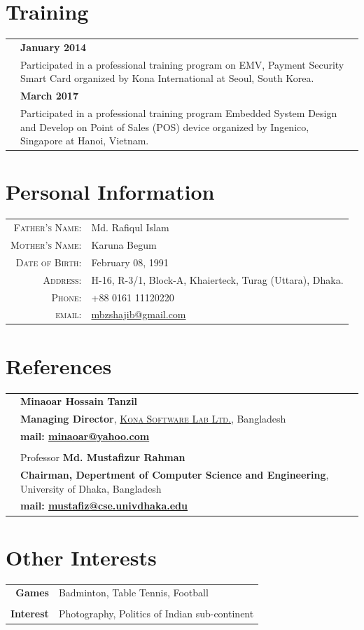 \documentclass[a4paper,10pt]{article}
\newcommand{\du}{University of Dhaka}
\newcommand{\bd}{Bangladesh}
\newcommand{\kslwithlink}{\textsc{\href{www.konai.com}{Kona Software Lab Ltd.}}}
\begin{document}
\section*{Training}

\begin{tabular}{r|p{16cm}}
							&\textbf{January 2014}\\
							&Participated in a professional training program on EMV, Payment Security Smart Card organized by Kona International at Seoul, South Korea.\\
							&\textbf{March 2017}\\
							&Participated in a professional training program Embedded System Design and Develop on Point of Sales (POS) device organized by Ingenico, Singapore at Hanoi, Vietnam.\\
\end{tabular}

\section*{Personal Information}

\begin{tabular}{r|l}
    \textsc{Father's Name:} & Md. Rafiqul Islam \\
    \textsc{Mother's Name:} & Karuna Begum \\    
    \textsc{Date of Birth:} & February 08, 1991 \\
    \textsc{Address:}   & H-16, R-3/1, Block-A, Khaierteck, Turag (Uttara), Dhaka. \\
    \textsc{Phone:}     & +88 0161 11120220\\
    \textsc{email:}     & \href{mailto:mbzshajib@gmail.com}{mbzshajib@gmail.com}  
    
\end{tabular}

\section*{References}
\begin{tabular}{r|l}
	&\textbf{Minaoar Hossain Tanzil}\\
			&\textbf{Managing Director}, \kslwithlink , \bd\\
			&\bf{mail:} \href{mailto:minaoar@yahoo.com}{minaoar@yahoo.com}\\\\					

	&Professor \textbf{Md. Mustafizur Rahman} \\
			&\textbf{Chairman, Depertment of Computer Science and Engineering}, \du , \bd\\
			&\bf{mail:} \href{mailto:mustafiz@cse.univdhaka.edu}{mustafiz@cse.univdhaka.edu}\\			


\end{tabular}

\section*{Other Interests}
\begin{tabular}{r|l}
\textbf{Games}							&Badminton, Table Tennis, Football\\\\
\textbf{Interest}						&Photography, Politics of Indian sub-continent\\
								
    
\end{tabular}
\end{document}
